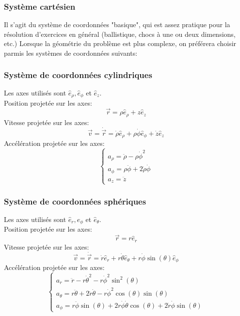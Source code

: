 \documentclass{article}
\numberwithin{equation}{section}
\begin{document}
\subsubsection{Système cartésien}
Il s'agit du système de coordonnées "basique", qui est assez pratique pour la résolution d'exercices en général (ballistique, chocs à une ou deux dimensions, etc.) Lorsque la géométrie du problème est plus complexe, on préférera choisir parmis les systèmes de coordonnées suivants:

\subsubsection{Système de coordonnées cylindriques}
Les axes utilisés sont \(\hat e_\rho, \hat e_\phi\) et \(\hat e_z\). \\

Position projetée sur les axes:
\begin{equation}
	\boxed{\vec r = \rho \hat e_\rho + z \hat e_z}
\end{equation}
Vitesse projetée sur les axes:
\begin{equation}
	\boxed{\vec v = \dot{\vec{r}} = \dot \rho \hat e_\rho + \rho \dot \phi \hat e_\phi + \dot z \hat e_z}
\end{equation}
Accélération projetée sur les axes:
\begin{equation}
	\boxed{\begin{cases}
			a_\rho = \ddot \rho - \rho \dot \phi^2 \\
			a_\phi = \rho \ddot \phi + 2 \dot \rho \dot \phi \\
			a_z = \ddot z 
		\end{cases}}
\end{equation}

\subsubsection{Système de coordonnées sphériques}
Les axes utilisés sont \(\hat e_r, \hat e_\phi\) et \(\hat e_\theta\). \\
Position projetée sur les axes:
\begin{equation}
	\boxed{\vec r = r \hat e_r}
\end{equation}
Vitesse projetée sur les axes:
\begin{equation}
	\boxed{\vec v = \dot{\vec r} = \dot r \hat e_r + r \dot \theta \hat e_\theta + r \dot \phi \sin(\theta) \hat e_\phi}
\end{equation}
Accélération projetée sur les axes:
\begin{equation}
	\boxed{\begin{cases}
	a_r 		= \ddot r - r \dot \theta^2 - r \dot \phi^2 \sin^2(\theta) \\
	a_\theta	= r \ddot \theta + 2 \dot r \dot \theta - r \dot \phi^2 \cos(\theta)\sin(\theta) \\
	a_\phi		= r \ddot \phi \sin(\theta) + 2r \dot \phi \dot \theta \cos(\theta) + 2 \dot r \dot \phi \sin(\theta)
	\end{cases}}
\end{equation}
\end{document}

